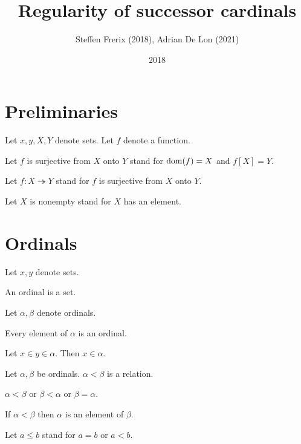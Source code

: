 \documentclass{article}
\title{Regularity of successor cardinals}
\author{Steffen Frerix (2018), Adrian De Lon (2021)}
\date{2018}
\newcommand{\surjects}{\twoheadrightarrow}
\begin{document}
  \maketitle


  \section{Preliminaries}

  \begin{forthel}

    Let $x, y, X, Y$ denote sets.
    Let $f$ denote a function.

    Let $f$ is surjective from $X$ onto $Y$ stand for $\operatorname{dom}(f) = X$ and $f[X] = Y$.

    Let $f : X \surjects Y$ stand for $f$ is surjective from $X$ onto $Y$.

    Let $X$ is nonempty stand for $X$ has an element.
  \end{forthel}


  \section{Ordinals}

  \begin{forthel}
    Let $x, y$ denote sets.

    \begin{signature}
      An ordinal is a set.
    \end{signature}

    Let $\alpha, \beta$ denote ordinals.

    \begin{axiom}
      Every element of $\alpha$ is an ordinal.
    \end{axiom}

    \begin{axiom}\label{Transitivity}
      Let $x \in y \in \alpha$.
      Then $x \in \alpha$.
    \end{axiom}

    \begin{signature}
      Let $\alpha, \beta$ be ordinals.
      $\alpha < \beta$ is a relation.
    \end{signature}

    \begin{axiom}
      $\alpha < \beta$ or $\beta < \alpha$ or $\beta = \alpha$.
    \end{axiom}

    \begin{axiom}
      If $\alpha < \beta$ then $\alpha$ is an element of $\beta$.
    \end{axiom}

    Let $a \leq b$ stand for $a = b$ or $a < b$.
  \end{forthel}
\end{document}

